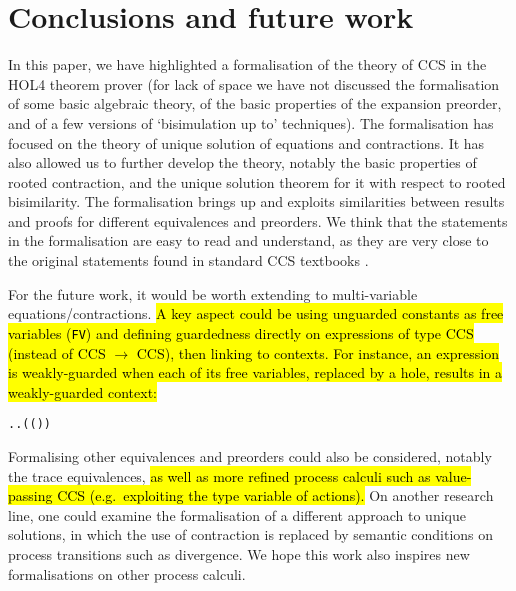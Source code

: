 
\section{Conclusions and future work}
\label{s:concl}

In this paper, we have highlighted a formalisation of the theory of CCS in the 
HOL4 theorem prover (for lack of space we have not discussed 
the formalisation of some basic algebraic theory, of the basic
properties of the expansion preorder,   and of a few
 versions of `bisimulation up to'
techniques). %
The formalisation has focused on the theory of
unique solution of equations and contractions. 
It has also allowed us to further develop the theory,
notably the basic properties of rooted contraction, and the unique
solution theorem for it with respect to rooted bisimilarity. 
The formalisation brings up and exploits similarities between results
and proofs for different equivalences and preorders. 
We think that the statements in the formalisation are easy to read and
understand, as they are very close to the original statements found in
standard CCS textbooks \cite{Gorrieri:2015jt,Mil89}.

For the future work, it would be worth extending
to multi-variable equations/contractions. \hl{A key aspect could be using unguarded constants as free variables
(\texttt{FV}) and defining guardedness directly on expressions of type CCS (instead of
CCS $\rightarrow$ CCS), then linking to contexts. For instance, an expression is weakly-guarded when each
of its free variables, replaced by a hole, results in a weakly-guarded context:}
\begin{alltt}
\HOLTokenTurnstile{}   \HOLSymConst{\HOLTokenEquiv{}}
   \HOLSymConst{\HOLTokenForall{}}.  \HOLSymConst{\HOLTokenIn{}}   \HOLSymConst{\HOLTokenImp{}} \HOLSymConst{\HOLTokenForall{}}.   \HOLSymConst{\HOLTokenConj{}} ( ( ) \HOLSymConst{=} ) \HOLSymConst{\HOLTokenImp{}}  
\end{alltt}

Formalising other equivalences and preorders could also be considered,
notably the trace equivalences, \hl{as well as more refined process
calculi such as value-passing CCS (e.g.~exploiting the type variable
of actions).}
%
On another research line, one could examine the formalisation of a different
approach \cite{DurierHS17} to unique
solutions, in which the use of contraction is
replaced by semantic conditions on process transitions such as
divergence. We hope this work also inspires new formalisations on
other process calculi.

